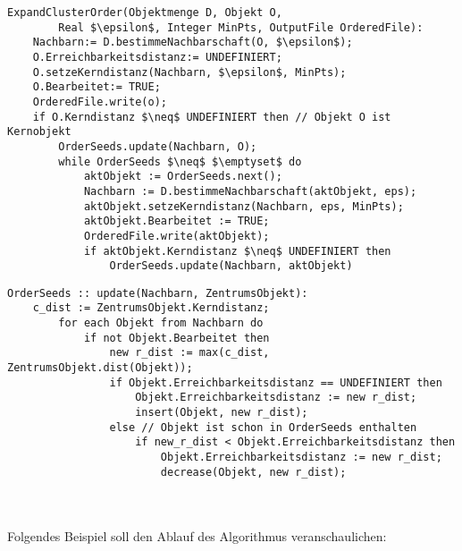 \documentclass[11pt,ceqn]{book}
\begin{document}
\begin{minipage}{\linewidth}
\begin{lstlisting}[frame=single,mathescape=true]
ExpandClusterOrder(Objektmenge D, Objekt O, 
		Real $\epsilon$, Integer MinPts, OutputFile OrderedFile):
	Nachbarn:= D.bestimmeNachbarschaft(O, $\epsilon$);
	O.Erreichbarkeitsdistanz:= UNDEFINIERT;
	O.setzeKerndistanz(Nachbarn, $\epsilon$, MinPts);
	O.Bearbeitet:= TRUE;
	OrderedFile.write(o);
	if O.Kerndistanz $\neq$ UNDEFINIERT then // Objekt O ist Kernobjekt
		OrderSeeds.update(Nachbarn, O);
		while OrderSeeds $\neq$ $\emptyset$ do
			aktObjekt := OrderSeeds.next();
			Nachbarn := D.bestimmeNachbarschaft(aktObjekt, eps);
			aktObjekt.setzeKerndistanz(Nachbarn, eps, MinPts);
			aktObjekt.Bearbeitet := TRUE;
			OrderedFile.write(aktObjekt);
			if aktObjekt.Kerndistanz $\neq$ UNDEFINIERT then
				OrderSeeds.update(Nachbarn, aktObjekt)
\end{lstlisting}
\end{minipage}

\begin{minipage}{\linewidth}
\begin{lstlisting}[frame=single,mathescape=true]
OrderSeeds :: update(Nachbarn, ZentrumsObjekt):
	c_dist := ZentrumsObjekt.Kerndistanz;
		for each Objekt from Nachbarn do
			if not Objekt.Bearbeitet then
				new r_dist := max(c_dist, ZentrumsObjekt.dist(Objekt));
				if Objekt.Erreichbarkeitsdistanz == UNDEFINIERT then
					Objekt.Erreichbarkeitsdistanz := new r_dist;
					insert(Objekt, new r_dist);
				else // Objekt ist schon in OrderSeeds enthalten
					if new_r_dist < Objekt.Erreichbarkeitsdistanz then
						Objekt.Erreichbarkeitsdistanz := new r_dist;
						decrease(Objekt, new r_dist);
\end{lstlisting}
\end{minipage}
\\~\\
Folgendes Beispiel soll den Ablauf des Algorithmus veranschaulichen:
\end{document}
